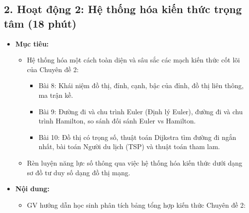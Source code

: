 \documentclass[12pt, a4paper]{article}
\begin{document}
\subsection*{2. Hoạt động 2: Hệ thống hóa kiến thức trọng tâm (18 phút)}

\begin{itemize}[leftmargin=1.2cm]
    \item[a)] \textbf{Mục tiêu:}
    \begin{itemize}[leftmargin=0.6cm]
        \item Hệ thống hóa một cách toàn diện và sâu sắc các mạch kiến thức cốt lõi của Chuyên đề 2:
        \begin{itemize}
            \item Bài 8: Khái niệm đồ thị, đỉnh, cạnh, bậc của đỉnh, đồ thị liên thông, ma trận kề.
            \item Bài 9: Đường đi và chu trình Euler (Định lý Euler), đường đi và chu trình Hamilton, so sánh đối sánh Euler vs Hamilton.
            \item Bài 10: Đồ thị có trọng số, thuật toán Dijkstra tìm đường đi ngắn nhất, bài toán Người du lịch (TSP) và thuật toán tham lam.
        \end{itemize}
        \item Rèn luyện năng lực số thông qua việc hệ thống hóa kiến thức dưới dạng sơ đồ tư duy số dạng đồ thị mạng.
    \end{itemize}

    \item[b)] \textbf{Nội dung:}
    \begin{itemize}[leftmargin=0.6cm]
        \item GV hướng dẫn học sinh phân tích bảng tổng hợp kiến thức Chuyên đề 2:
    \end{itemize}


\end{itemize}
\end{document}
